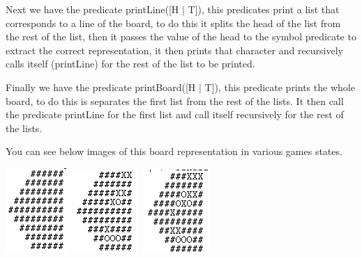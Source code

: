 \documentclass[12pt]{article}
\begin{document}
Next we have the predicate printLine([H $|$ T]), this predicates print a list that corresponds
to a line of the board, to do this it splits the head of the list from the rest
of the list, then it passes the value of the head to the symbol predicate to extract
the correct representation, it then prints that character and recursively calls
itself (printLine) for the rest of the list to be printed.

Finally we have the predicate printBoard([H $|$ T]), this predicate prints the whole
board, to do this is separates the first list from the rest of the lists. It then
call the predicate printLine for the first list and call itself recursively for
the rest of the lists.

You can see below images of this board representation in various games states.

\begin{center}
\includegraphics[width=0.3\linewidth]{start_game_print.png} %
\includegraphics[width=0.3\linewidth]{mid_game_print.png} %
\includegraphics[width=0.3\linewidth]{game_print.png} %
\end{center}
\end{document}
